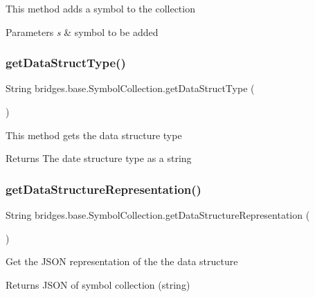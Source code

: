 This method adds a symbol to the collection 
\begin{DoxyParams}{Parameters}
{\em s} & symbol to be added \\
\hline
\end{DoxyParams}
\mbox{\label{classbridges_1_1base_1_1_symbol_collection_afbc928d2e6818edec96d10f52feebacb}} 
\subsubsection{\texorpdfstring{getDataStructType()}{getDataStructType()}}
{\footnotesize\ttfamily String bridges.\+base.\+Symbol\+Collection.\+get\+Data\+Struct\+Type (\begin{DoxyParamCaption}{ }\end{DoxyParamCaption})}

This method gets the data structure type

\begin{DoxyReturn}{Returns}
The date structure type as a string 
\end{DoxyReturn}
\mbox{\label{classbridges_1_1base_1_1_symbol_collection_a706ad8a7bcf12c194403ac3281c73674}} 
\subsubsection{\texorpdfstring{getDataStructureRepresentation()}{getDataStructureRepresentation()}}
{\footnotesize\ttfamily String bridges.\+base.\+Symbol\+Collection.\+get\+Data\+Structure\+Representation (\begin{DoxyParamCaption}{ }\end{DoxyParamCaption})}

Get the J\+S\+ON representation of the the data structure \begin{DoxyReturn}{Returns}
J\+S\+ON of symbol collection (string) 
\end{DoxyReturn}


